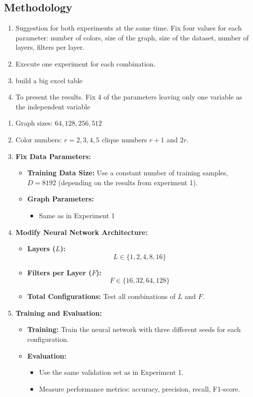 \subsection{Methodology}

\begin{enumerate}
    \item Suggestion for both experiments at the same time. Fix four values for each parameter: number of colors, size of the graph, size of the dataset, number of layers, filters per layer. 
    \item Execute one experiment for each combination. 
    \item build a big excel table 
    \item To present the results. Fix 4 of the parameters leaving only one variable as the independent variable 
\end{enumerate}


\begin{enumerate}
    \item Graph sizes: $64,128,256,512$
    \item Color numbers: $r= 2,3,4,5$ clique numbers $r+1$ and $2r$. 
    \item \textbf{Fix Data Parameters:}
    \begin{itemize}
        \item \textbf{Training Data Size:} Use a constant number of training samples, $D = 8192$ (depending on the results from experiment 1).
        \item \textbf{Graph Parameters:}
        \begin{itemize}
            \item Same as in Experiment 1
        \end{itemize}
    \end{itemize}
    \item \textbf{Modify Neural Network Architecture:}
    \begin{itemize}
        \item \textbf{Layers ($L$):}
        \[
        L \in \{1, 2, 4, 8, 16\}
        \]
        \item \textbf{Filters per Layer ($F$):}
        \[
        F \in \{16, 32, 64, 128\}
        \]
        \item \textbf{Total Configurations:} Test all combinations of $L$ and $F$.
    \end{itemize}
    \item \textbf{Training and Evaluation:}
    \begin{itemize}
        \item \textbf{Training:} Train the neural network with three different seeds for each configuration.
        \item \textbf{Evaluation:}
        \begin{itemize}
            \item Use the same validation set as in Experiment 1.
            \item Measure performance metrics: accuracy, precision, recall, F1-score.
        \end{itemize}
    \end{itemize}
\end{enumerate}

